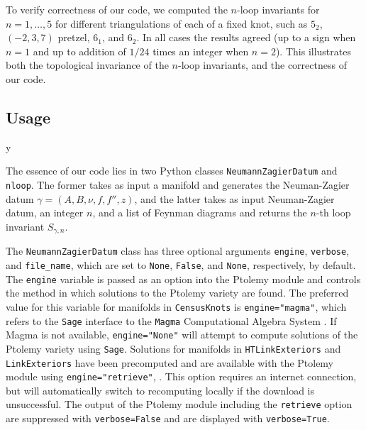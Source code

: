 \documentclass[12pt]{amsart}
\theoremstyle{definition}
\def\printname#1{
        \if\draft y
                \smash{\makebox[0pt]{\hspace{-0.5in}
                        \raisebox{8pt}{\tt\tiny #1}}}
        \fi
}
\def\lbl#1{\label{#1}\printname{#1}}
\def\ga{\gamma}
\begin{document}
To verify correctness of our code, we computed the $n$-loop invariants for
$n=1,\dots,5$ for different triangulations of each of a fixed knot, such 
as $5_2$, $(-2,3,7)$ pretzel, $6_1$, and $6_2$. In all cases the results 
agreed (up to a sign when $n=1$ and up to addition of $1/24$ times an integer 
when $n=2$). This illustrates both the topological invariance of the 
$n$-loop invariants, and the correctness of our code.

\subsection{Usage}
\lbl{sub.usage}

The essence of our code lies in two Python classes \texttt{NeumannZagierDatum}
and \texttt{nloop}. The former takes as input a manifold and generates the 
Neuman-Zagier datum $\ga=(A,B,\nu,f,f'',z)$, and the latter takes as input
Neuman-Zagier datum, an integer $n$, and a list of Feynman diagrams
and returns the $n$-th loop invariant $S_{\gamma,n}$.

The \texttt{NeumannZagierDatum} class has three optional arguments
\texttt{engine}, \texttt{verbose}, and \texttt{file\_name}, which are set to 
\texttt{None}, \texttt{False}, and \texttt{None}, respectively, by default. 
The \texttt{engine} variable is passed as an option into the Ptolemy module 
and controls the method in which solutions to the Ptolemy variety are found. 
The preferred value for this variable for manifolds in \texttt{CensusKnots} 
is \texttt{engine="magma"}, which refers to the \texttt{Sage} interface to 
the \texttt{Magma} Computational Algebra System \cite{magma}.
If Magma is not available, \texttt{engine="None"} will attempt to compute 
solutions of the Ptolemy variety using \texttt{Sage}. 
Solutions for 
manifolds in \texttt{HTLinkExteriors} and \texttt{LinkExteriors} have been 
precomputed and are available with the Ptolemy module using 
\texttt{engine="retrieve"}, \cite{Ga:ptolemy}. This option requires an 
internet connection, but will automatically switch to recomputing locally 
if the download is unsuccessful. The output of the Ptolemy module including the
\texttt{retrieve} option are suppressed with \texttt{verbose=False} and are
displayed with \texttt{verbose=True}.
\end{document}

